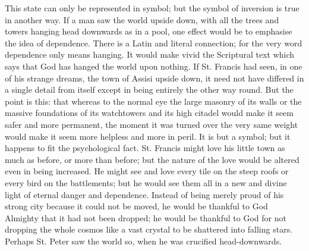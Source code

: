 \documentclass{book}
\begin{document}
This state can only be represented in symbol; but the symbol of inversion is true in another way. If a man saw the world upside down, with all the trees and towers hanging head downwards as in a pool, one effect would be to emphasise the idea of dependence. There is a Latin and literal connection; for the very word dependence only means hanging. It would make vivid the Scriptural text which says that God has hanged the world upon nothing. If St. Francis had seen, in one of his strange dreams, the town of Assisi upside down, it need not have differed in a single detail from itself except in being entirely the other way round. But the point is this: that whereas to the normal eye the large masonry of its walls or the massive foundations of its watchtowers and its high citadel would make it seem safer and more permanent, the moment it was turned over the very same weight would make it seem more helpless and more in peril. It is but a symbol; but it happens to fit the psychological fact. St. Francis might love his little town as much as before, or more than before; but the nature of the love would be altered even in being increased. He might see and love every tile on the steep roofs or every bird on the battlements; but he would see them all in a new and divine light of eternal danger and dependence. Instead of being merely proud of his strong city because it could not be moved, he would be thankful to God Almighty that it had not been dropped; he would be thankful to God for not dropping the whole cosmos like a vast crystal to be shattered into falling stars. Perhaps St. Peter saw the world so, when he was crucified head-downwards.
\end{document}
